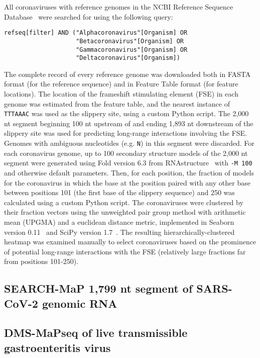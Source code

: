 \documentclass[main.tex]{subfiles}
\begin{document}
All coronaviruses with reference genomes in the NCBI Reference Sequence Database~\cite{OLeary2016} were searched for using the following query:
\begin{verbatim}
refseq[filter] AND ("Alphacoronavirus"[Organism] OR
                    "Betacoronavirus"[Organism] OR
                    "Gammacoronavirus"[Organism] OR
                    "Deltacoronavirus"[Organism])
\end{verbatim}
The complete record of every reference genome was downloaded both in FASTA format (for the reference sequence) and in Feature Table format (for feature locations).
The location of the frameshift stimulating element (FSE) in each genome was estimated from the feature table, and the nearest instance of \verb|TTTAAAC| was used as the slippery site, using a custom Python script.
The 2,000 nt segment beginning 100 nt upstream of and ending 1,893 nt downstream of the slippery site was used for predicting long-range interactions involving the FSE.
Genomes with ambiguous nucleotides (e.g. \verb|N|) in this segment were discarded.
For each coronavirus genome, up to 100 secondary structure models of the 2,000 nt segment were generated using Fold version 6.3 from RNAstructure~\cite{Mathews2004a} with \verb|-M 100| and otherwise default parameters.
Then, for each position, the fraction of models for the coronavirus in which the base at the position paired with any other base between positions 101 (the first base of the slippery sequence) and 250 was calculated using a custom Python script.
The coronaviruses were clustered by their fraction vectors using the unweighted pair group method with arithmetic mean (UPGMA) and a euclidean distance metric, implemented in Seaborn version 0.11~\cite{Waskom2021} and SciPy version 1.7~\cite{Virtanen2020}.
The resulting hierarchically-clustered heatmap was examined manually to select coronaviruses based on the prominence of potential long-range interactions with the FSE (relatively large fractions far from positions 101-250).


\subsection{SEARCH-MaP  1,799 nt segment of SARS-CoV-2 genomic RNA}


\subsection{DMS-MaPseq of live transmissible gastroenteritis virus}
\end{document}

